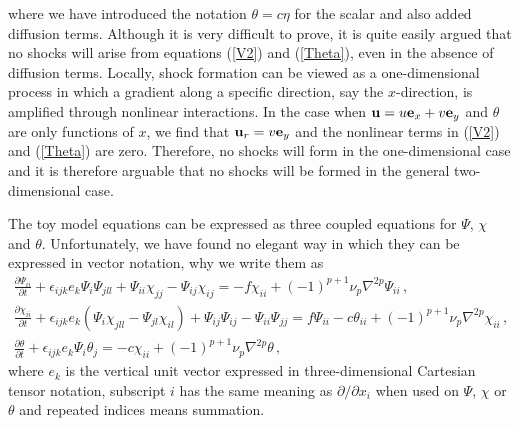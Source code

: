where we have introduced the notation $ \theta = c \eta $ for the scalar and also added diffusion terms.  
Although it is very difficult to prove, it is quite easily argued that no shocks will arise from equations (\ref{V2}) and (\ref{Theta}), even in the absence of diffusion terms.  Locally, shock formation can be viewed as a one-dimensional process in which a gradient along a specific direction, say the $ x $-direction,  is amplified through nonlinear interactions. In the case  when $ {\bf u} = u {\bf e}_x + v {\bf e}_y $  and $ \theta $ are only functions of $ x $, we find that $ {\bf u}_r = v {\bf e}_y $ and the nonlinear terms in (\ref{V2}) and (\ref{Theta}) are zero. Therefore, no shocks will form in the one-dimensional case and it is therefore arguable that no shocks will be formed in the general two-dimensional case. 

The toy model equations can be expressed as three coupled equations for $ \Psi $, $ \chi $ and $ \theta $. Unfortunately, we have found no elegant way in which they can be expressed in vector notation, why we write them as
\begin{eqnarray} \label{PsiEq}
\frac{\partial{\Psi_{ii}}}{\partial t} +\epsilon_{ijk}e_k \Psi_i \Psi_{jll} + \Psi_{ii} \chi_{jj} - \Psi_{ij} \chi_{ij} = -f \chi_{ii} + (-1)^{p+1} \nu_p \nabla^{2p} \Psi_{ii} \, , \\ \label{ChiEq}
\frac{\partial{\chi_{ii}}}{\partial t} +\epsilon_{ijk}e_k (\Psi_i \chi_{jll} - \Psi_{jl} \chi_{il}) + \Psi_{ij} \Psi_{ij} - \Psi_{ii} \Psi_{jj} =  f \Psi_{ii} - c \theta_{ii} + (-1)^{p+1} \nu_p \nabla^{2p} \chi_{ii} \, , \\ \label{ThetaEq} 
\frac{\partial{\theta}}{\partial t} + \epsilon_{ijk}e_k \Psi_i \theta_{j} = - c \chi_{ii} + (-1)^{p+1} \nu_p \nabla^{2p} \theta \, ,
\end{eqnarray} 
where $ e_k $ is the vertical unit vector expressed in three-dimensional Cartesian tensor notation,  subscript $ i $  has the same meaning as $ {\partial }/{\partial x_i }$ when used on $ \Psi $,  $ \chi $ or $ \theta $ and repeated indices means summation. 


